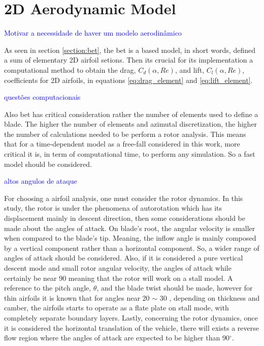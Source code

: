 \section{2D Aerodynamic Model}
\label{section:aero_model}


\textcolor{blue}{Motivar a necessidade de haver um modelo aerodinâmico}

As seen in section \ref{section:bet}, the \gls{bet} is a based model, in short words, defined a sum of elementary 2D airfoil setions. Then its crucial for its implementation a computational method to obtain the drag, $C_d (\alpha, Re) $, and  lift, $C_l (\alpha, Re)$, coefficients for 2D airfoils, in equations \ref{eq:drag_element} and \ref{eq:lift_element}.

\textcolor{blue}{questões computacionais}

Also \gls{bet} has critical consideration rather the number of elements used to define a blade. The higher the number of elements and azimutal discretization, the higher the number of calculations needed to be perform a rotor analysis. This means that for a time-dependent model as a free-fall considered in this work, more critical it is, in term of computational time, to perform any simulation. So a fast model should be considered.


\textcolor{blue}{altos angulos de ataque}

For choosing a airfoil analysis, one must consider the rotor dynamics. In this study, the rotor is under the phenomena of autorotation which has its displacement mainly in descent direction, then some considerations should be made about the angles of attack. On blade's root, the angular velocity is smaller when compared to the blade's tip. Meaning, the inflow angle is mainly composed by a vertical component rather than a horizontal component. So, a wider range of angles of attack should be considered. Also, if it is considered a pure vertical descent mode and small rotor angular velocity, the angles of attack while certainly be near 90 \unit{\deg} meaning that the rotor will work on a stall model. A reference to the pitch angle, $\theta$, and the blade twist should be made, however for thin airfoils it is known that for angles near 20 $\sim$ 30 \unit{\deg}, depending on thickness and camber, the airfoils starts to operate as a flate plate on stall mode, with completely separate boundary layers. Lastly, concerning the rotor dynamics, once it is considered the horizontal translation of the vehicle, there will exists a reverse flow region where the angles of attack are expected to be higher than 90$^{\circ}$.


